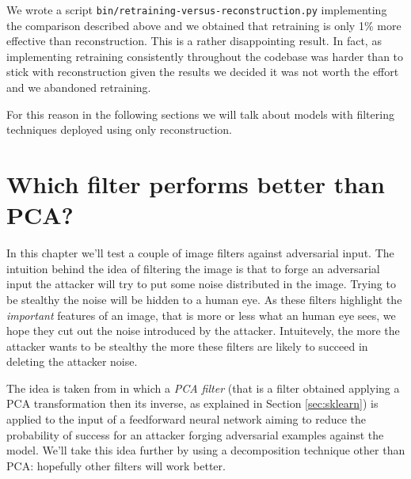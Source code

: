 We wrote a script \texttt{bin/retraining-versus-reconstruction.py}
implementing the comparison described above and we obtained that
retraining is only 1\% more effective than reconstruction. This is a
rather disappointing result. In fact, as implementing retraining
consistently throughout the codebase was harder than to stick with
reconstruction given the results we decided it was not worth the effort
and we abandoned retraining.

For this reason in the following sections we will talk about models
with filtering techniques deployed using only reconstruction.

\section{Which filter performs better than PCA?}

In this chapter we'll test a couple of image filters against
adversarial input. The intuition behind the idea of filtering the image
is that to forge an adversarial input the attacker will try to put some
noise distributed in the image. Trying to be stealthy the noise will be
hidden to a human eye. As these filters highlight the \emph{important}
features of an image, that is more or less what an human eye sees, we
hope they cut out the noise introduced by the attacker. Intuitevely,
the more the attacker wants to be stealthy the more these filters are
likely to succeed in deleting the attacker noise.

The idea is taken from \cite{bhagoji2018enhancing} in which a \emph{PCA
  filter} (that is a filter obtained applying a PCA transformation then
its inverse, as explained in Section \ref{sec:sklearn}) is applied to
the input of a feedforward neural network aiming to reduce the
probability of success for an attacker forging adversarial examples
against the model. We'll take this idea further by using a
decomposition technique other than PCA: hopefully other filters will
work better.

